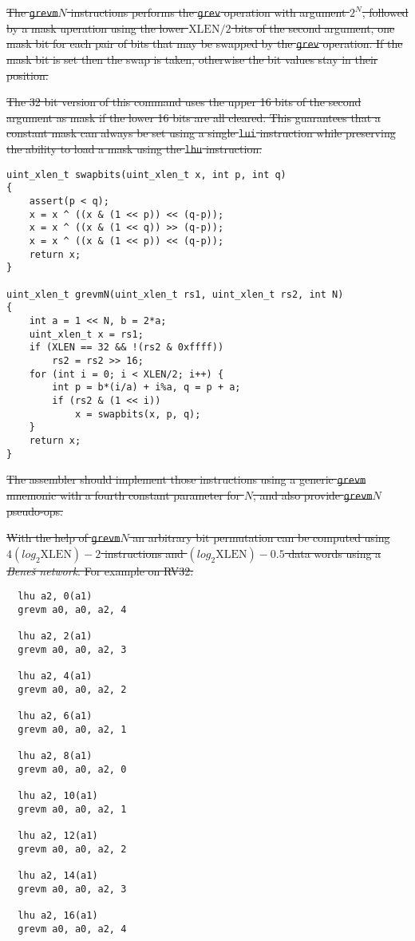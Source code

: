 
\section{}

\sout{
The \texttt{grevm}$N$ instructions performs the \texttt{grev} operation
with argument $2^N$, followed by a mask uperation using the lower
$\textrm{XLEN}/2$ bits of the second argument, one mask bit for each pair of bits
that may be swapped by the \texttt{grev} operation. If the mask bit
is set then the swap is taken, otherwise the bit values stay in their
position.
}

\sout{
The 32 bit version of this command uses the upper 16 bits of the second argument
as mask if the lower 16 bits are all cleared. This guarantees that a constant
mask can always be set using a single {\tt lui} instruction while preserving
the ability to load a mask using the {\tt lhu} instruction.
}

\begin{verbatim}
uint_xlen_t swapbits(uint_xlen_t x, int p, int q)
{
    assert(p < q);
    x = x ^ ((x & (1 << p)) << (q-p));
    x = x ^ ((x & (1 << q)) >> (q-p));
    x = x ^ ((x & (1 << p)) << (q-p));
    return x;
}

uint_xlen_t grevmN(uint_xlen_t rs1, uint_xlen_t rs2, int N)
{
    int a = 1 << N, b = 2*a;
    uint_xlen_t x = rs1;
    if (XLEN == 32 && !(rs2 & 0xffff))
        rs2 = rs2 >> 16;
    for (int i = 0; i < XLEN/2; i++) {
        int p = b*(i/a) + i%a, q = p + a;
        if (rs2 & (1 << i))
            x = swapbits(x, p, q);
    }
    return x;
}
\end{verbatim}

\sout{
The assembler should implement those instructions using a generic \texttt{grevm}
mnemonic with a fourth constant parameter for $N$, and also provide
\texttt{grevm}$N$ pseudo-ops.
}

\sout{
With the help of \texttt{grevm}$N$ an arbitrary bit permutation can be computed
using $4(log_2\textrm{XLEN})-2$ instructions and $(log_2\textrm{XLEN})-0.5$ data words using a
{\it Bene\v{s} network}. For example on RV32:
}

\begin{verbatim}
  lhu a2, 0(a1)
  grevm a0, a0, a2, 4

  lhu a2, 2(a1)
  grevm a0, a0, a2, 3

  lhu a2, 4(a1)
  grevm a0, a0, a2, 2

  lhu a2, 6(a1)
  grevm a0, a0, a2, 1

  lhu a2, 8(a1)
  grevm a0, a0, a2, 0

  lhu a2, 10(a1)
  grevm a0, a0, a2, 1

  lhu a2, 12(a1)
  grevm a0, a0, a2, 2

  lhu a2, 14(a1)
  grevm a0, a0, a2, 3

  lhu a2, 16(a1)
  grevm a0, a0, a2, 4
\end{verbatim}

